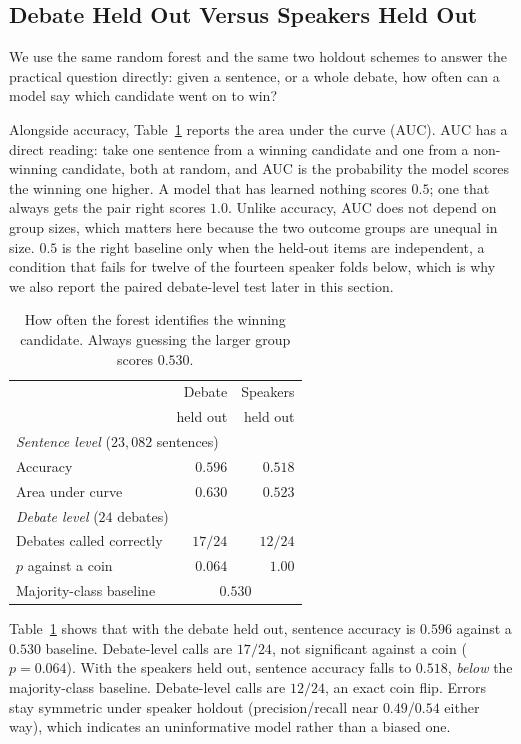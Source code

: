 \documentclass[pdflatex,sn-mathphys-num]{sn-jnl}%
\begin{document}
\subsection{Debate Held Out Versus Speakers Held Out}
\label{sec:method:heldout}

We use the same random forest and the same two holdout schemes to answer the
practical question directly: given a sentence, or a whole debate, how often
can a model say which candidate went on to win?

Alongside accuracy, Table~\ref{tab:accuracy} reports the area under the
curve (AUC). AUC has a direct reading: take one sentence from a winning
candidate and one from a non-winning candidate, both at random, and AUC is
the probability the model scores the winning one higher. A model that has
learned nothing scores $0.5$; one that always gets the pair right scores
$1.0$. Unlike accuracy, AUC does not depend on group sizes, which matters
here because the two outcome groups are unequal in size. $0.5$ is the
right baseline only when the held-out items are independent, a condition
that fails for twelve of the fourteen speaker folds below, which is why we
also report the paired debate-level test later in this section.

\begin{table}[t]
\caption{How often the forest identifies the winning candidate. Always
guessing the larger group scores $0.530$.}
\label{tab:accuracy}
\centering
\footnotesize
\setlength{\tabcolsep}{4pt}
\begin{tabular}{lrr}
\toprule
 & Debate & Speakers \\
 & held out & held out \\
\midrule
\multicolumn{3}{l}{\emph{Sentence level} ($23{,}082$ sentences)} \\
Accuracy               & $0.596$ & $0.518$ \\
Area under curve       & $0.630$ & $0.523$ \\
\midrule
\multicolumn{3}{l}{\emph{Debate level} ($24$ debates)} \\
Debates called correctly & $17/24$ & $12/24$ \\
$p$ against a coin       & $0.064$ & $1.00$ \\
\midrule
Majority-class baseline  & \multicolumn{2}{c}{$0.530$} \\
\bottomrule
\end{tabular}
\end{table}

Table~\ref{tab:accuracy} shows that with the debate held out, sentence
accuracy is $0.596$ against a $0.530$ baseline. Debate-level calls are
$17/24$, not significant against a coin ($p = 0.064$). With the speakers
held out, sentence accuracy falls to $0.518$, \emph{below} the
majority-class baseline. Debate-level calls are $12/24$, an exact coin
flip. Errors stay symmetric under speaker holdout (precision/recall near
$0.49$/$0.54$ either way), which indicates an uninformative model rather
than a biased one.
\end{document}
